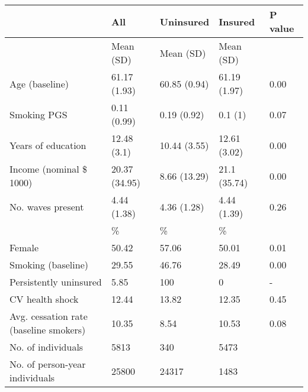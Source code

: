 % 
\begin{tabular}{lllll}
  \toprule
\textbf{  } & \textbf{ All } & \textbf{ Uninsured } & \textbf{ Insured } & \textbf{ P value } \\ 
  \midrule
 & Mean (SD) & Mean (SD) & Mean (SD) &  \\ 
   \midrule
Age (baseline) & 61.17 (1.93) & 60.85 (0.94) & 61.19 (1.97) & 0.00 \\ 
  Smoking PGS & 0.11 (0.99) & 0.19 (0.92) & 0.1 (1) & 0.07 \\ 
  Years of education & 12.48 (3.1) & 10.44 (3.55) & 12.61 (3.02) & 0.00 \\ 
  Income (nominal \$ 1000) & 20.37 (34.95) & 8.66 (13.29) & 21.1 (35.74) & 0.00 \\ 
  No. waves present & 4.44 (1.38) & 4.36 (1.28) & 4.44 (1.39) & 0.26 \\ 
   & \% & \% & \% &  \\ 
  Female & 50.42 & 57.06 & 50.01 & 0.01 \\ 
  Smoking (baseline) & 29.55 & 46.76 & 28.49 & 0.00 \\ 
  Persistently uninsured & 5.85 & 100 & 0 & - \\ 
  CV health shock & 12.44 & 13.82 & 12.35 & 0.45 \\ 
  Avg. cessation rate (baseline smokers) & 10.35 & 8.54 & 10.53 & 0.08 \\ 
  No. of individuals & 5813 & 340 & 5473 &  \\ 
   \midrule
No. of person-year individuals & 25800 & 24317 & 1483 &  \\ 
  \end{tabular}
